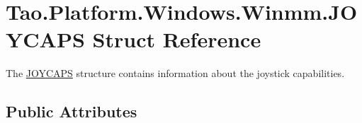 \hypertarget{struct_tao_1_1_platform_1_1_windows_1_1_winmm_1_1_j_o_y_c_a_p_s}{
\section{Tao.Platform.Windows.Winmm.JOYCAPS Struct Reference}
\label{struct_tao_1_1_platform_1_1_windows_1_1_winmm_1_1_j_o_y_c_a_p_s}
}


The \hyperlink{struct_tao_1_1_platform_1_1_windows_1_1_winmm_1_1_j_o_y_c_a_p_s}{JOYCAPS} structure contains information about the joystick capabilities.  


\subsection*{Public Attributes}
